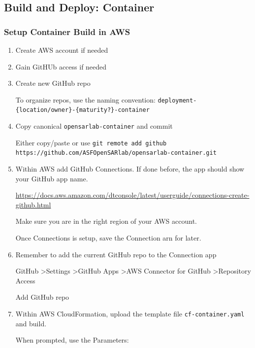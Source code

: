 \subsection{Build and Deploy: Container}

\subsubsection{Setup Container Build in AWS}

\begin{enumerate}
\item Create AWS account if needed


\item Gain GitHUb access if needed


\item Create new GitHub repo

To organize repos, use the naming convention: \texttt{deployment-\{location/owner\}-\{maturity?\}-container}


\item Copy canonical \texttt{opensarlab-container} and commit

Either copy/paste or use \texttt{git remote add github https://github.com/ASFOpenSARlab/opensarlab-container.git}


\item Within AWS add GitHub Connections. If done before, the app should show your GitHub app name.

\href{https://docs.aws.amazon.com/dtconsole/latest/userguide/connections-create-github.html}{https://docs.aws.amazon.com/dtconsole/latest/userguide/connections-create-github.html}

Make sure you are in the right region of your AWS account.

Once Connections is setup, save the Connection arn for later.


\item Remember to add the current GitHub repo to the Connection app

GitHub \textgreater  Settings \textgreater  GitHub Apps \textgreater  AWS Connector for GitHub \textgreater  Repository Access

Add GitHub repo


\item Within AWS CloudFormation, upload the template file \texttt{cf-container.yaml} and build.

When prompted, use the Parameters:


\end{enumerate}

